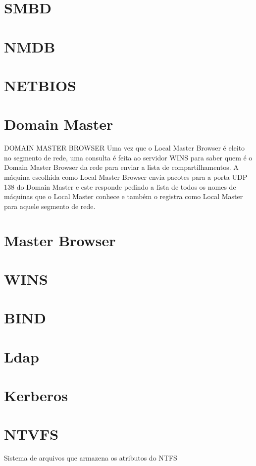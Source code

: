 \section{SMBD}

\section{NMDB}

\section{NETBIOS}

\section{Domain Master}

DOMAIN MASTER BROWSER Uma vez que o Local Master Browser é eleito no segmento de rede, uma consulta é feita ao servidor WINS para saber quem é o Domain Master Browser da rede para enviar a lista de compartilhamentos. A máquina escolhida como Local Master Browser envia pacotes para a porta UDP 138 do Domain Master e este responde pedindo a lista de todos os nomes de máquinas que o Local Master conhece e também o registra como Local Master para aquele segmento de rede.

\section{Master Browser}

\section{WINS}

\section{BIND}

\section{Ldap}

\section{Kerberos}

\section{NTVFS}

Sistema de arquivos que armazena os atributos do NTFS
